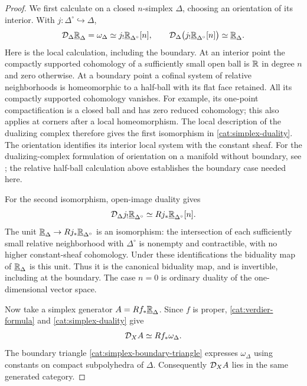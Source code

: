 \begin{proof}
We first calculate on a closed $n$-simplex $\Delta$, choosing an
orientation of its interior.  With $j:\Delta^\circ\hookrightarrow
\Delta$,
\begin{equation}
 \label{cat:simplex-duality}
 \mathcal D_\Delta\underline{\mathbb R}_{\Delta}
   =\omega_\Delta
   \simeq j_!\underline{\mathbb R}_{\Delta^\circ}[n],
 \qquad
 \mathcal D_\Delta\bigl(j_!\underline{\mathbb R}_{\Delta^\circ}[n]\bigr)
   \simeq\underline{\mathbb R}_{\Delta}.
\end{equation}
Here is the local calculation, including the boundary.  At an interior
point the compactly supported cohomology of a sufficiently small open
ball is $\mathbb R$ in degree $n$ and zero otherwise.  At a boundary point a
cofinal system of relative neighborhoods is homeomorphic to a half-ball
with its flat face retained.  All its compactly supported cohomology
vanishes.  For example, its one-point compactification is a closed ball
and has zero reduced cohomology; this also applies at corners after a
local homeomorphism.  The local description of the dualizing complex
therefore gives the first isomorphism in
\eqref{cat:simplex-duality}.  The orientation identifies its interior
local system with the constant sheaf.  For the dualizing-complex
formulation of orientation on a manifold without boundary, see
\cite[\S11.7]{SchapiraNotes}; the relative half-ball calculation above
establishes the boundary case needed here.

For the second isomorphism, open-image duality gives
\[
 \mathcal D_\Delta j_!\underline{\mathbb R}_{\Delta^\circ}
 \simeq Rj_*\underline{\mathbb R}_{\Delta^\circ}[n].
\]
The unit $\underline{\mathbb R}_{\Delta}\to
Rj_*\underline{\mathbb R}_{\Delta^\circ}$ is an isomorphism: the intersection of
each sufficiently small relative neighborhood with $\Delta^\circ$ is
nonempty and contractible, with no higher constant-sheaf cohomology.
Under these identifications the biduality map of
$\underline{\mathbb R}_{\Delta}$ is this unit.  Thus it is the canonical
biduality map, and is invertible, including at the boundary.  The case
$n=0$ is ordinary duality of the one-dimensional vector space.

Now take a simplex generator $A=Rf_*\underline{\mathbb R}_{\Delta}$.
Since $f$ is proper, \eqref{cat:verdier-formula} and
\eqref{cat:simplex-duality} give
\[
 \mathcal D_X A\simeq Rf_*\omega_\Delta.
\]
The boundary triangle \eqref{cat:simplex-boundary-triangle} expresses
$\omega_\Delta$ using constants on compact subpolyhedra of $\Delta$.
Consequently $\mathcal D_XA$ lies in the same generated category.


\end{proof}
